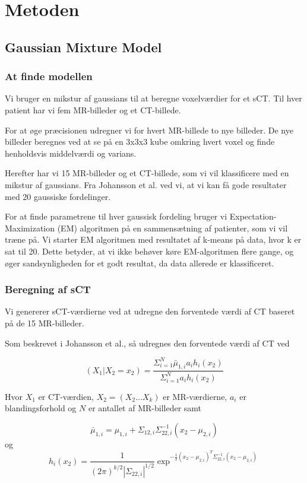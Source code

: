 \section{Metoden}
\subsection{Gaussian Mixture Model}

\subsubsection{At finde modellen}
Vi bruger en mikstur af gaussians til at beregne voxelværdier
for et sCT. Til hver patient har vi fem MR-billeder og et CT-billede.

For at øge præcisionen udregner vi for hvert MR-billede
to nye billeder. De nye billeder beregnes ved at se på en 3x3x3
kube omkring hvert voxel og finde henholdsvis middelværdi og varians.

Herefter har vi 15 MR-billeder og et CT-billede, som vi vil klassificere
med en mikstur af gaussians. Fra Johansson et al. ved vi, at vi kan få
gode resultater med 20 gaussiske fordelinger. 

For at finde parametrene til hver gaussisk fordeling bruger vi
Expecta\-tion-Maximization (EM) algoritmen på en sammensætning af patienter, som
vi vil træne på. Vi starter EM algoritmen med resultatet af k-means på
data, hvor k er sat til 20. Dette betyder, at vi ikke behøver køre
EM-algoritmen flere gange, og øger sandsynligheden for et godt resultat, da
data allerede er klassificeret.

\subsubsection{Beregning af sCT}

Vi genererer sCT-værdierne ved at udregne den forventede værdi af CT baseret på de 15 MR-billeder. 

Som beskrevet i Johansson et al., så udregnes den forventede værdi af CT ved

\begin{equation}
(X_1 | X_2 = x_2) = \frac{\Sigma^{N}_{i=1} \bar{\mu}_{1,i} a_i h_i(x_2)}{\Sigma^{N}_{i=1} a_i h_i(x_2)}
\end{equation}

Hvor $X_1$ er CT-værdien, $X_2 = (X_2 \dots X_k)$ er MR-værdierne, $a_i$ er blandingsforhold og $N$ er antallet af MR-billeder samt

\begin{equation}
 \bar{\mu}_{1,i} = \mu_{1,i} + \Sigma_{1 2, i} \Sigma^{-1}_{22, i}(x_2 - \mu_{2,i})
\end{equation}
og
\begin{equation}
h_i(x_2)= \frac{1}{( 2 \pi )^{k/2}|\Sigma_{22,i}|^{1/2}}\exp^{-\frac{1}{2}(x_2 - \mu_{2,i})^T \Sigma^{-1}_{22, i}(x_2 - \mu_{2,i})}
\end{equation}

